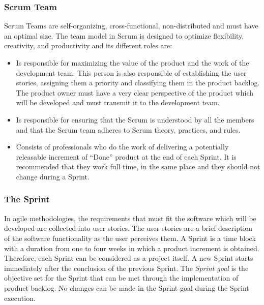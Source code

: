 \subsubsection{Scrum Team} \label{5-ScrumTeam}
Scrum Teams are self-organizing, cross-functional, non-distributed and must have an optimal size. The team model in Scrum is designed to optimize flexibility, creativity, and productivity and its different roles are:

\begin{itemize}
	\item {} Is responsible for maximizing the value of the product and the work of the	development team. This person is also responsible of establishing the user stories, assigning them a priority and classifying them in the product backlog. The product owner must have a very clear perspective of the product which will be developed and must transmit it to the development team.
	
	\item {} Is responsible for ensuring that the Scrum is understood by all the members and that the Scrum team adheres to Scrum theory, practices, and rules. 
	
	\item {} Consists of professionals who do the work of delivering a potentially releasable increment of “Done” product at the end of each Sprint. It is recommended that they work full time, in the same place and they should not change during a Sprint.
\end{itemize}


\subsubsection{The Sprint}

In agile methodologies, the requirements that must fit the software which will be developed are collected into user stories. The user stories \cite{Coh04} are a brief description of the software functionality as the user perceives them. A Sprint is a time block with a duration from one to four weeks in which a product increment is obtained. Therefore, each Sprint can be considered as a project itself. A new Sprint starts immediately after the conclusion of the previous Sprint. The \emph{Sprint goal} is the objective set for the Sprint that can be met through the implementation of product backlog. No changes can be made in the Sprint goal during the Sprint execution. 


